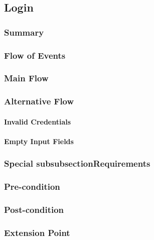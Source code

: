 \subsection{Login}
\subsubsection{Summary}

\subsubsection{Flow of Events}
\subsubsection*{Main Flow}

\subsubsection*{Alternative Flow}
\paragraph{Invalid Credentials}

\paragraph{Empty Input Fields}

\subsubsection{Special subsubsectionRequirements}

\subsubsection{Pre-condition}

\subsubsection{Post-condition}

\subsubsection{Extension Point}